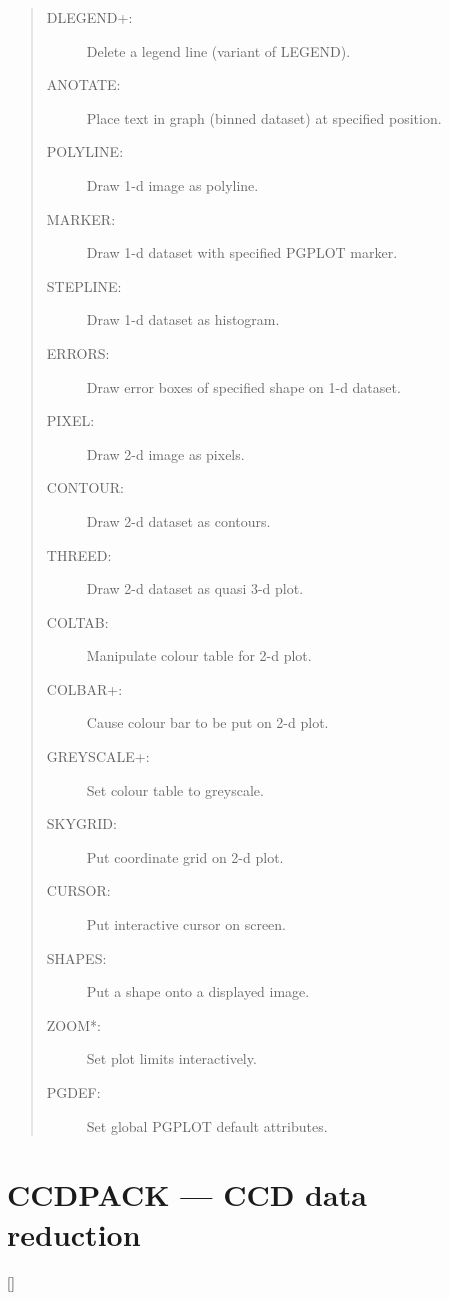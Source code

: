 \begin{description}
\begin{quote}
\begin{description}
\item [DLEGEND+:]  Delete a legend line (variant of LEGEND).
\item [ANOTATE:]   Place text in graph (binned dataset) at specified position.
\\
\item [POLYLINE:]  Draw 1-d image as polyline.
\item [MARKER:]    Draw 1-d dataset with specified PGPLOT marker.
\item [STEPLINE:]  Draw 1-d dataset as histogram.
\item [ERRORS:]    Draw error boxes of specified shape on 1-d dataset.
\\
\item [PIXEL:]     Draw 2-d image as pixels.
\item [CONTOUR:]   Draw 2-d dataset as contours.
\item [THREED:]    Draw 2-d dataset as quasi 3-d plot.
\\
\item [COLTAB:]    Manipulate colour table for 2-d plot.
\item [COLBAR+:]   Cause colour bar to be put on 2-d plot.
\item [GREYSCALE+:]  Set colour table to greyscale.
\item [SKYGRID:]   Put coordinate grid on 2-d plot.
\\
\item [CURSOR:]    Put interactive cursor on screen.
\item [SHAPES:]    Put a shape onto a displayed image.
\item [ZOOM*:]     Set plot limits interactively.
\\
\item [PGDEF:]     Set global PGPLOT default attributes.
\end{description}
\end{quote}
\end{description}

\newpage

\section{CCDPACK --- CCD data reduction}

\vspace{-10mm}

\hfill []

\vspace{2mm}

